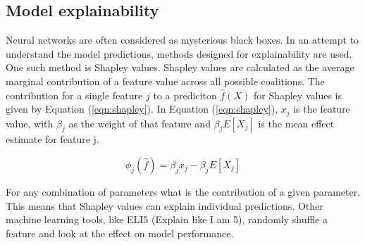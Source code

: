 \subsection{Model explainability}
Neural networks are often considered as mysterious black boxes\cite{nn_black_box}. In an attempt to understand the model predictions, methods designed for explainability are used. One such method is Shapley values\cite{shapley_information}. Shapley values are calculated as the average marginal contribution of a feature value across all possible coalitions. The contribution for a single feature $j$ to a prediciton $\hat{f}(X)$ for Shapley values is given by Equation (\ref{eqn:shapley}). In Equation (\ref{eqn:shapley}), $x_j$ is the feature value, with $\beta_j$ as the weight of that feature and $\beta_j E\left[X_j\right]$ is the mean effect estimate for feature j.

\begin{equation}
    \label{eqn:shapley}
    \phi_j(\hat{f}) = \beta_jx_j-\beta_jE \left[ X_j \right]
\end{equation}

For any combination of parameters what is the contribution of a given parameter. This means that Shapley values can explain individual predictions. Other machine learning tools, like ELI5 (Explain like I am 5), randomly shuffle a feature and look at the effect on model performance\cite{eli5_information}.